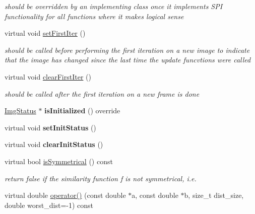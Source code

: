 \begin{DoxyCompactItemize}
\begin{DoxyCompactList}\small\item\em should be overridden by an implementing class once it implements S\-P\-I functionality for all functions where it makes logical sense \end{DoxyCompactList}\item 
\hypertarget{classAppearanceModel_a0cd5810a7ceca3418eaed254b4f11196}{virtual void \hyperlink{classAppearanceModel_a0cd5810a7ceca3418eaed254b4f11196}{set\-First\-Iter} ()}\label{classAppearanceModel_a0cd5810a7ceca3418eaed254b4f11196}

\begin{DoxyCompactList}\small\item\em should be called before performing the first iteration on a new image to indicate that the image has changed since the last time the update funcvtions were called \end{DoxyCompactList}\item 
\hypertarget{classAppearanceModel_a22302ac79fade071132848888ee050d1}{virtual void \hyperlink{classAppearanceModel_a22302ac79fade071132848888ee050d1}{clear\-First\-Iter} ()}\label{classAppearanceModel_a22302ac79fade071132848888ee050d1}

\begin{DoxyCompactList}\small\item\em should be called after the first iteration on a new frame is done \end{DoxyCompactList}\item 
\hypertarget{classAppearanceModel_adba6fa45d22db0134b365e1450a7b751}{\hyperlink{structImgStatus}{Img\-Status} $\ast$ {\bfseries is\-Initialized} () override}\label{classAppearanceModel_adba6fa45d22db0134b365e1450a7b751}

\item 
\hypertarget{classAppearanceModel_a3f8dd00e2abca94e123c2e44094de1dc}{virtual void {\bfseries set\-Init\-Status} ()}\label{classAppearanceModel_a3f8dd00e2abca94e123c2e44094de1dc}

\item 
\hypertarget{classAppearanceModel_a4809d14b7283044bbcb7361bca874070}{virtual void {\bfseries clear\-Init\-Status} ()}\label{classAppearanceModel_a4809d14b7283044bbcb7361bca874070}

\item 
virtual bool \hyperlink{classAppearanceModel_a432b2d068bf735abfa58c023773e1721}{is\-Symmetrical} () const 
\begin{DoxyCompactList}\small\item\em return false if the similarity function f is not symmetrical, i.\-e. \end{DoxyCompactList}\item 
\hypertarget{classAppearanceModel_a4e003afff892e69cf673e92710760563}{virtual double \hyperlink{classAppearanceModel_a4e003afff892e69cf673e92710760563}{operator()} (const double $\ast$a, const double $\ast$b, size\-\_\-t dist\-\_\-size, double worst\-\_\-dist=-\/1) const }\label{classAppearanceModel_a4e003afff892e69cf673e92710760563}


\end{DoxyCompactItemize}
